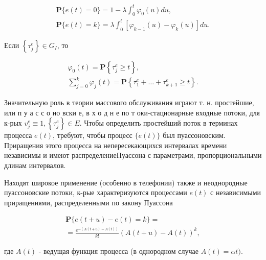 \documentclass[10pt]{article}
\begin{document}
\[

\begin{gathered}

\mathbf{P}\{e(t)=0\}=1-\lambda \int_{0}^{t} \varphi_{0}(u) d u, \\

\mathbf{P}\{e(t)=k\}=\lambda \int_{0}^{t}\left[\varphi_{k-1}(u)-\varphi_{k}(u)\right] d u .

\end{gathered}

\]



Если $\left\{\tau_{j}^{e}\right\} \in G_{I}$, то



\[

\begin{gathered}

\varphi_{0}(t)=\mathbf{P}\left\{\tau_{j}^{e} \geqslant t\right\}, \\

\sum_{j=0}^{k} \varphi_{j}(t)=\mathbf{P}\left\{\tau_{1}^{e}+\ldots+\tau_{k+1}^{e} \geqslant t\right\} .

\end{gathered}

\]



Значительную роль в теории массового обслуживания играют т. н. простейшие, или п у а с с о но вски е, в х о д н е по т оки-стационарные входные потоки, для к-рых $v_{j}^{e} \equiv 1,\left\{\tau_{j}^{e}\right\} \in E$. Чтобы определить простейший поток в терминах процесса $e(t)$, требуют, чтобы процесс $\{e(t)\}$ был пуассоновским. Приращения этого процесса на непересекающихся интервалах времени независимы и имеют распределениеПуассона с параметрами, пропорциональными длинам интервалов.



Находят широкое применение (особенно в телефонии) также и неоднородные пуассоновские потоки, к-рые характеризуются процессами $e(t)$ с независимыми приращениями, распределенными по закону Пуассона



\[

\begin{gathered}

\mathbf{P}\{e(t+u)-e(t)=k\}= \\

=\frac{e^{-(A(t+u)-A(t))}}{k !}(A(t+u)-A(t))^{k},

\end{gathered}

\]



где $A(t)$ - ведущая функция процесса (в однородном случае $A(t)=\alpha t)$.
\end{document}
